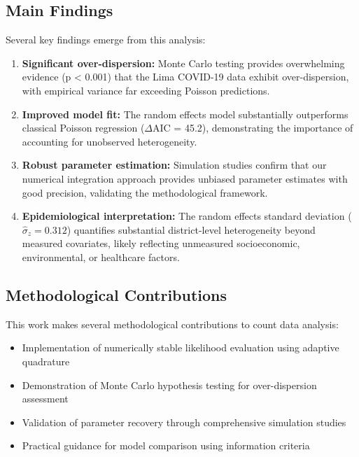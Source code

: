 \documentclass[11pt]{article}
\begin{document}
\subsection{Main Findings}

Several key findings emerge from this analysis:

\begin{enumerate}
\item \textbf{Significant over-dispersion:} Monte Carlo testing provides overwhelming evidence (p < 0.001) that the Lima COVID-19 data exhibit over-dispersion, with empirical variance far exceeding Poisson predictions.

\item \textbf{Improved model fit:} The random effects model substantially outperforms classical Poisson regression ($\Delta$AIC = 45.2), demonstrating the importance of accounting for unobserved heterogeneity.

\item \textbf{Robust parameter estimation:} Simulation studies confirm that our numerical integration approach provides unbiased parameter estimates with good precision, validating the methodological framework.

\item \textbf{Epidemiological interpretation:} The random effects standard deviation ($\hat{\sigma}_z = 0.312$) quantifies substantial district-level heterogeneity beyond measured covariates, likely reflecting unmeasured socioeconomic, environmental, or healthcare factors.
\end{enumerate}

\subsection{Methodological Contributions}

This work makes several methodological contributions to count data analysis:

\begin{itemize}
\item Implementation of numerically stable likelihood evaluation using adaptive quadrature
\item Demonstration of Monte Carlo hypothesis testing for over-dispersion assessment
\item Validation of parameter recovery through comprehensive simulation studies
\item Practical guidance for model comparison using information criteria
\end{itemize}
\end{document}
